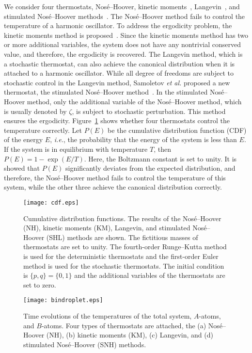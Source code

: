 \documentclass[pre,twocolumn]{revtex4}
\begin{document}
We consider four thermostats, 
Nos\'e--Hoover, 
kinetic moments~\cite{Hoover_1996},
Langevin~\cite{Allen_1989}, and 
stimulated Nos\'e--Hoover methods~\cite{Samoletov2007}.
The Nos\'e--Hoover method fails to control the temperature of a harmonic oscillator.
To address the ergodicity problem, the kinetic moments method is proposed~\cite{Hoover_1996}.
Since the kinetic moments method has two or more additional variables, the system does not have any nontrivial conserved value, and therefore, the ergodicity is recovered.
The Langevin method, which is a stochastic thermostat, can also achieve the canonical distribution when it is attached to a harmonic oscillator.
While all degree of freedoms are subject to stochastic control in the Langevin method, 
Samoletov \textit{et al.} proposed a new thermostat, the stimulated Nos\'e--Hoover method~\cite{Samoletov2007}.
In the stimulated Nos\'e--Hoover method, only the additional variable of the Nos\'e--Hoover method,
which is usually denoted by $\zeta$, is subject to stochastic perturbation.
This method ensures the ergodicity.
Figure~\ref{fig_cdf} shows whether four thermostats control the temperature correctly.
Let $P(E)$ be the cumulative distribution function (CDF) of the energy $E$,
\textit{i.e.}, the probability that the energy of the system is less than $E$.
If the system is in equilibrium with temperature $T$, then $P(E) = 1 - \exp(E/T)$.
Here, the Boltzmann constant is set to unity.
It is showed that $P(E)$ significantly deviates from
the expected distribution, and therefore, the Nos\'e--Hoover method fails to control the temperature of this system, while the other three achieve the canonical distribution correctly.

\begin{figure}
\centering
\texttt{[image: cdf.eps]}
\caption{Cumulative distribution functions.
The results of the Nos\'e--Hoover (NH), kinetic moments (KM), Langevin, and stimulated Nos\'e--Hoover  (SHL) methods are shown. 
The fictitious masses of thermostats are set to unity.
The fourth-order Runge--Kutta method is used for the deterministic thermostats
and the first-order Euler method is used for the stochastic thermostats.
The initial condition is $\{p, q\} = \{0, 1\}$ and the additional variables of the 
thermostats are set to zero.
}
\label{fig_cdf}
\end{figure}

\begin{figure}
\centering
\texttt{[image: bindroplet.eps]}
\caption{
Time evolutions of the temperatures of the total system,
$A$-atoms, and $B$-atoms.
Four types of thermostats are attached, the
(a) Nos\'e--Hoover (NH),
(b) kinetic moments (KM),
(c) Langevin, and
(d) stimulated Nos\'e--Hoover (SNH) methods.
}
\label{fig_bindroplet}
\end{figure}
\end{document}
